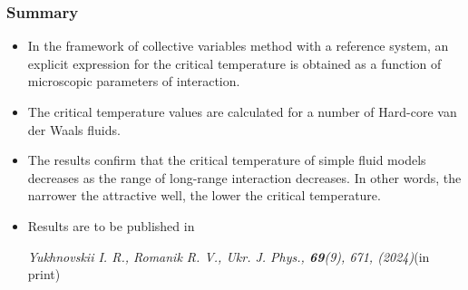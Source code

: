 \documentclass[8pt]{beamer}
\begin{document}
	\begin{frame}
		\frametitle{Summary}
		
		\begin{itemize}
			
			\item In the framework of collective variables method with a reference system, an explicit expression for the critical temperature is obtained as a function of microscopic parameters of interaction.
			
			\vspace{5mm}
			
			\item The critical temperature values are calculated for a number of Hard-core van der Waals fluids.
			
			\vspace{5mm}
			
			\item The results confirm that the critical temperature of simple fluid models decreases as the range of long-range interaction decreases. In other words, the narrower the attractive well, the lower the critical temperature.
			
			\vspace{5mm}
			
			\item Results are to be published in
			
			\textit{Yukhnovskii I. R., Romanik R. V., Ukr. J. Phys., {\bf 69}(9), 671, (2024)}(in print)
			
			
		\end{itemize}
	\end{frame}
	
	
	
\end{document}
